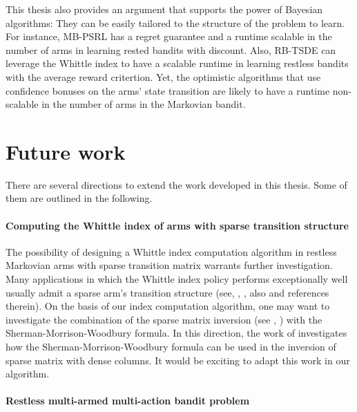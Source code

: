 This thesis also provides an argument that supports the power of Bayesian algorithms: They can be easily tailored to the structure of the problem to learn.
For instance, MB-PSRL has a regret guarantee and a runtime scalable in the number of arms in learning rested bandits with discount.
Also, RB-TSDE \cite{akbarzadeh2022learning} can leverage the Whittle index to have a scalable runtime in learning restless bandits with the average reward critertion.
Yet, the optimistic algorithms that use confidence bonuses on the arms' state transition are likely to have a runtime non-scalable in the number of arms in the Markovian bandit.


\section{Future work}

There are several directions to extend the work developed in this thesis. Some of them are outlined in the following.

\paragraph{Computing the Whittle index of arms with sparse transition structure}

The possibility of designing a Whittle index computation algorithm in restless Markovian arms with sparse transition matrix warrants further investigation.
Many applications in which the Whittle index policy performs exceptionally well usually admit a sparse arm's transition structure (see, \eg, \cite{wang1995finite, nino2002dynamic, aalto2018whittle}, also \cite{wang2020restless} and references therein).
On the basis of our index computation algorithm, one may want to investigate the combination of the sparse matrix inversion (see \eg, \cite{dulmage1962inversion, niessner1983computing}) with the Sherman-Morrison-Woodbury formula.
In this direction, the work of \cite{vanderbei1991splitting} investigates how the Sherman-Morrison-Woodbury formula can be used in the inversion of sparse matrix with dense columns.
It would be exciting to adapt this work in our algorithm.

\paragraph{Restless multi-armed multi-action bandit problem}

